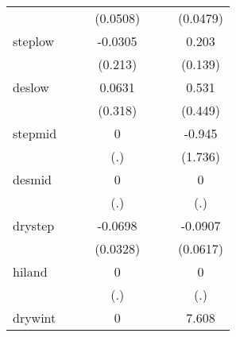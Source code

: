 {\begin{tabular}{l*{6}{c}}
            &                     &                     &    (0.0508)         &                     &                     &    (0.0479)         \\
[1em]
steplow     &                     &                     &     -0.0305         &                     &                     &       0.203         \\
            &                     &                     &     (0.213)         &                     &                     &     (0.139)         \\
[1em]
deslow      &                     &                     &      0.0631         &                     &                     &       0.531         \\
            &                     &                     &     (0.318)         &                     &                     &     (0.449)         \\
[1em]
stepmid     &                     &                     &           0         &                     &                     &      -0.945         \\
            &                     &                     &         (.)         &                     &                     &     (1.736)         \\
[1em]
desmid      &                     &                     &           0         &                     &                     &           0         \\
            &                     &                     &         (.)         &                     &                     &         (.)         \\
[1em]
drystep     &                     &                     &     -0.0698         &                     &                     &     -0.0907         \\
            &                     &                     &    (0.0328)         &                     &                     &    (0.0617)         \\
[1em]
hiland      &                     &                     &           0         &                     &                     &           0         \\
            &                     &                     &         (.)         &                     &                     &         (.)         \\
[1em]
drywint     &                     &                     &           0         &                     &                     &       7.608         \\

\end{tabular}}
